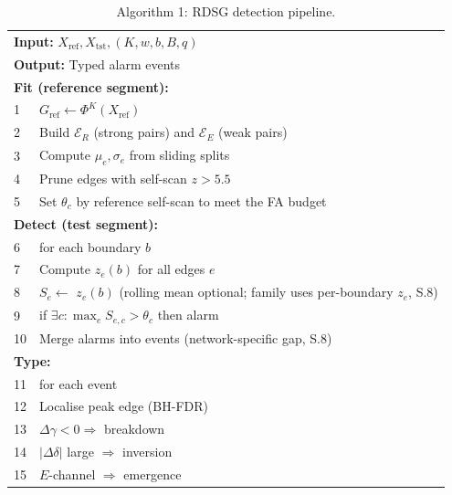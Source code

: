 \documentclass[11pt,a4paper]{article}
\begin{document}
\begin{table}[t]\centering\small
\caption{Algorithm 1: RDSG detection pipeline.}
\label{alg:rdsg}
\begin{tabular}{ll}\hline
\multicolumn{2}{l}{\textbf{Input:} $X_{\mathrm{ref}}, X_{\mathrm{tst}}, (K, w, b, B, q)$} \\
\multicolumn{2}{l}{\textbf{Output:} Typed alarm events} \\ \hline
\multicolumn{2}{l}{\textbf{Fit (reference segment):}} \\
1 & $G_{\mathrm{ref}} \gets \Phi^K(X_{\mathrm{ref}})$ \\
2 & Build $\mathcal{E}_R$ (strong pairs) and $\mathcal{E}_E$ (weak pairs) \\
3 & Compute $\mu_e, \sigma_e$ from sliding splits \\
4 & Prune edges with self-scan $z > 5.5$ \\
5 & Set $\theta_c$ by reference self-scan to meet the FA budget \\ \hline
\multicolumn{2}{l}{\textbf{Detect (test segment):}} \\
6 & for each boundary $b$ \\
7 & \quad Compute $z_e(b)$ for all edges $e$ \\
8 & \quad $S_e \gets$ $z_e(b)$ (rolling mean optional; family uses per-boundary $z_e$, S.8) \\
9 & \quad if $\exists c:\max_e S_{e,c} > \theta_c$ then alarm \\
10 & Merge alarms into events (network-specific gap, S.8) \\ \hline
\multicolumn{2}{l}{\textbf{Type:}} \\
11 & for each event \\
12 & \quad Localise peak edge (BH-FDR) \\
13 & \quad $\Delta\gamma < 0 \Rightarrow$ breakdown \\
14 & \quad $|\Delta\delta|$ large $\Rightarrow$ inversion \\
15 & \quad $E$-channel $\Rightarrow$ emergence \\ \hline
\end{tabular}
\end{table}
\end{document}
